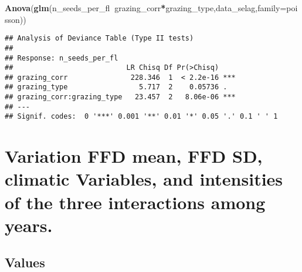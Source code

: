 \documentclass[
]{article}
\newenvironment{Shaded}{\begin{snugshade}}{\end{snugshade}}
\newcommand{\CommentTok}[1]{\textcolor[rgb]{0.56,0.35,0.01}{\textit{#1}}}
\newcommand{\DataTypeTok}[1]{\textcolor[rgb]{0.13,0.29,0.53}{#1}}
\newcommand{\KeywordTok}[1]{\textcolor[rgb]{0.13,0.29,0.53}{\textbf{#1}}}
\newcommand{\NormalTok}[1]{#1}
\newcommand{\OperatorTok}[1]{\textcolor[rgb]{0.81,0.36,0.00}{\textbf{#1}}}
\newcommand{\StringTok}[1]{\textcolor[rgb]{0.31,0.60,0.02}{#1}}
\begin{document}
\begin{Shaded}
\begin{Highlighting}[]
\KeywordTok{Anova}\NormalTok{(}\KeywordTok{glm}\NormalTok{(n_seeds_per_fl}\OperatorTok{~}\NormalTok{grazing_corr}\OperatorTok{*}\NormalTok{grazing_type,data_selag,}\DataTypeTok{family=}\NormalTok{poisson))}
\end{Highlighting}
\end{Shaded}

\begin{verbatim}
## Analysis of Deviance Table (Type II tests)
## 
## Response: n_seeds_per_fl
##                           LR Chisq Df Pr(>Chisq)    
## grazing_corr               228.346  1  < 2.2e-16 ***
## grazing_type                 5.717  2    0.05736 .  
## grazing_corr:grazing_type   23.457  2   8.06e-06 ***
## ---
## Signif. codes:  0 '***' 0.001 '**' 0.01 '*' 0.05 '.' 0.1 ' ' 1
\end{verbatim}

\hypertarget{variation-ffd-mean-ffd-sd-climatic-variables-and-intensities-of-the-three-interactions-among-years.}{%
\section{Variation FFD mean, FFD SD, climatic Variables, and intensities
of the three interactions among
years.}\label{variation-ffd-mean-ffd-sd-climatic-variables-and-intensities-of-the-three-interactions-among-years.}}

\hypertarget{values}{%
\subsection{Values}\label{values}}

\begin{Shaded}
\end{Shaded}
\end{document}
